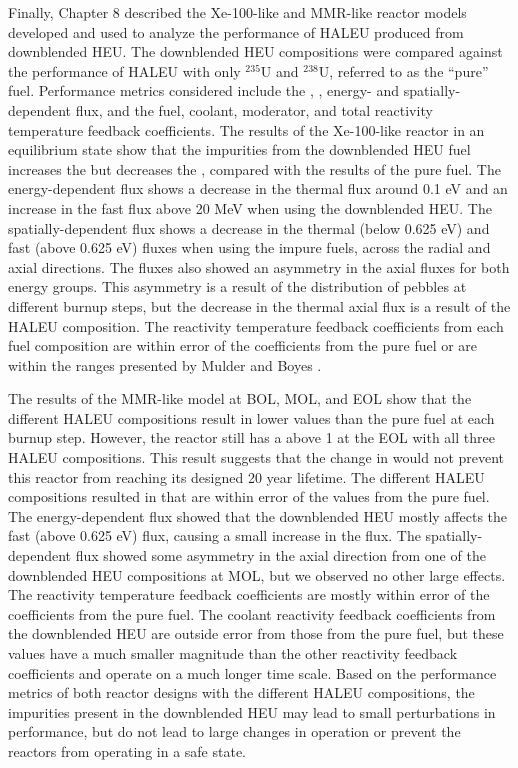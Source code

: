 Finally, Chapter 8 described the Xe-100-like and 
\gls{MMR}-like reactor models developed and 
used to analyze the performance of \gls{HALEU} produced from 
downblended \gls{HEU}. The downblended \gls{HEU} compositions 
were compared against the performance of \gls{HALEU} with only 
$^{235}$U and $^{238}$U, referred to as the ``pure'' fuel. 
Performance metrics considered include the 
\keff, \betaEff, energy- and spatially-dependent flux, and 
the fuel, coolant, moderator, and total reactivity temperature 
feedback coefficients. The results of the Xe-100-like 
reactor in an equilibrium state show that the impurities from 
the downblended 
\gls{HEU} fuel increases the \keff but decreases the \betaEff, 
compared with the results of the pure fuel. 
The energy-dependent flux shows a decrease in the thermal flux 
around 0.1 eV and an increase in the fast flux above 20 MeV 
when using the downblended \gls{HEU}. The spatially-dependent 
flux shows a decrease in the thermal (below 0.625 eV) and 
fast (above 0.625 eV) fluxes when using the impure fuels, 
across the radial and axial directions. 
The fluxes also showed an asymmetry 
in the axial fluxes for both energy groups. This asymmetry 
is a result of the distribution of pebbles at different 
burnup steps, but the decrease in the thermal axial 
flux is a result of the \gls{HALEU} composition.
 The reactivity temperature 
feedback coefficients from each fuel composition are within 
error of the coefficients from the pure fuel or are within 
the ranges presented by Mulder and Boyes 
\cite{mulder_neutronics_2020}.

The results of the \gls{MMR}-like model at \gls{BOL}, \gls{MOL}, 
and \gls{EOL} show that the different \gls{HALEU} compositions 
result in lower \keff values than the pure fuel at each burnup 
step. However, 
the reactor still has a \keff above 1 at the \gls{EOL} with all 
three \gls{HALEU} compositions. 
This result suggests that the change in \keff would not prevent this 
reactor from reaching its designed 20 year lifetime. The 
different \gls{HALEU} compositions resulted in \betaEff that 
are within error of the values from the pure fuel. The 
energy-dependent 
flux showed that the downblended \gls{HEU} mostly affects 
the fast (above 0.625 eV) flux, causing a small increase in 
the flux. The spatially-dependent flux showed some 
asymmetry in the axial direction from one of the downblended 
\gls{HEU} compositions at \gls{MOL}, but we observed no other large 
effects. The reactivity temperature feedback coefficients 
are mostly within error of the coefficients from the pure fuel. 
The coolant reactivity feedback coefficients from the downblended 
\gls{HEU} are outside error from those from the pure fuel, 
but these values have a much smaller magnitude than the other 
reactivity feedback coefficients and operate on a much 
longer time scale. Based on the performance metrics of 
both reactor designs with the different \gls{HALEU} 
compositions, the impurities present in the downblended 
\gls{HEU} may lead to small perturbations in performance, but do 
not lead to large changes in operation or prevent the 
reactors from operating in a safe state. 
 
